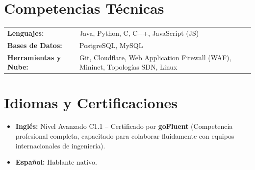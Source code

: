 \documentclass[10pt,a4paper]{article}
\begin{document}
\section{Competencias Técnicas}
\noindent
\begin{tabular}{@{}p{1.4in} p{5.0in}@{}}
    \textbf{Lenguajes:} & Java, Python, C, C++, JavaScript (JS) \\
    \textbf{Bases de Datos:} & PostgreSQL, MySQL \\
    \textbf{Herramientas y Nube:} & Git, Cloudflare, Web Application Firewall (WAF), Mininet, Topologías SDN, Linux
\end{tabular}

\section{Idiomas y Certificaciones}
\begin{itemize}
    \item \textbf{Inglés:} Nivel Avanzado C1.1 -- Certificado por \textbf{goFluent} (Competencia profesional completa, capacitado para colaborar fluidamente con equipos internacionales de ingeniería).
    \item \textbf{Español:} Hablante nativo.
\end{itemize}
\end{document}
